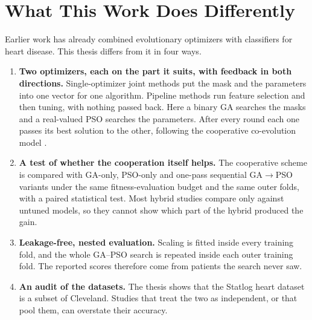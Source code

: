 \documentclass[MTech]{ugthesis}
\begin{document}
\section{What This Work Does Differently}
\label{sec:novelty}
Earlier work has already combined evolutionary optimizers with classifiers for heart disease. This thesis differs from it in four ways.
\begin{enumerate}
\item \textbf{Two optimizers, each on the part it suits, with feedback in both directions.} Single-optimizer joint methods \citep{huang2006gasvm,lin2008psosvm,abdar2019n2genetic} put the mask and the parameters into one vector for one algorithm. Pipeline methods \citep{cao2025dlpso,warsi2024gasvm} run feature selection and then tuning, with nothing passed back. Here a binary GA searches the masks and a real-valued PSO searches the parameters. After every round each one passes its best solution to the other, following the cooperative co-evolution model \citep{potter1994cc,ma2019ccsurvey}.
\item \textbf{A test of whether the cooperation itself helps.} The cooperative scheme is compared with GA-only, PSO-only and one-pass sequential GA$\rightarrow$PSO variants under the same fitness-evaluation budget and the same outer folds, with a paired statistical test. Most hybrid studies compare only against untuned models, so they cannot show which part of the hybrid produced the gain.
\item \textbf{Leakage-free, nested evaluation.} Scaling is fitted inside every training fold, and the whole GA--PSO search is repeated inside each outer training fold. The reported scores therefore come from patients the search never saw.
\item \textbf{An audit of the datasets.} The thesis shows that the Statlog heart dataset is a subset of Cleveland. Studies that treat the two as independent, or that pool them, can overstate their accuracy.
\end{enumerate}
\end{document}
